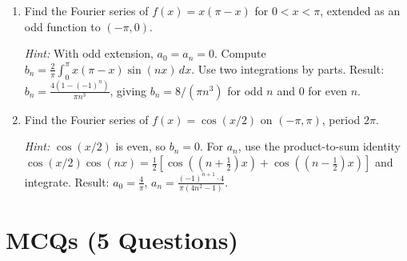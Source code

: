 \documentclass[12pt,a4paper]{article}
\begin{document}
\begin{enumerate}[label=\textbf{P\arabic*.}]
\item Find the Fourier series of $f(x) = x(\pi - x)$ for $0 < x < \pi$, extended as an odd function to $(-\pi, 0)$.

\textit{Hint:} With odd extension, $a_0 = a_n = 0$. Compute $b_n = \frac{2}{\pi}\int_0^{\pi}x(\pi-x)\sin(nx)\,dx$. Use two integrations by parts. Result: $b_n = \frac{4(1-(-1)^n)}{\pi n^3}$, giving $b_n = 8/(\pi n^3)$ for odd $n$ and $0$ for even $n$.

\item Find the Fourier series of $f(x) = \cos(x/2)$ on $(-\pi, \pi)$, period $2\pi$.

\textit{Hint:} $\cos(x/2)$ is even, so $b_n = 0$. For $a_n$, use the product-to-sum identity $\cos(x/2)\cos(nx) = \frac{1}{2}[\cos((n+\frac{1}{2})x) + \cos((n-\frac{1}{2})x)]$ and integrate. Result: $a_0 = \frac{4}{\pi}$, $a_n = \frac{(-1)^{n+1}\cdot 4}{\pi(4n^2-1)}$.

\end{enumerate}

\section{MCQs (5 Questions)}
\end{document}
